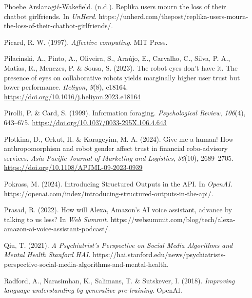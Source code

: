 \documentclass[
  letterpaper,
  DIV=11,
  numbers=noendperiod]{scrartcl}
\newlength{\cslhangindent}
\newenvironment{CSLReferences}[2] %
 {\begin{list}{}{%
  \setlength{\itemindent}{0pt}
  \setlength{\leftmargin}{0pt}
  \setlength{\parsep}{0pt}
  \ifodd #1
   \setlength{\leftmargin}{\cslhangindent}
   \setlength{\itemindent}{-1\cslhangindent}
  \fi
  \setlength{\itemsep}{#2\baselineskip}}}
 {\end{list}}
\begin{document}
\begin{CSLReferences}{1}{0}
Phoebe Arslanagić-Wakefield. (n.d.). Replika users mourn the loss of
their chatbot girlfriends. In \emph{UnHerd}.
https://unherd.com/thepost/replika-users-mourn-the-loss-of-their-chatbot-girlfriends/.

Picard, R. W. (1997). \emph{Affective computing}. MIT Press.

Pilacinski, A., Pinto, A., Oliveira, S., Araújo, E., Carvalho, C.,
Silva, P. A., Matias, R., Menezes, P. \& Sousa, S. (2023). The robot
eyes don't have it. {The} presence of eyes on collaborative robots
yields marginally higher user trust but lower performance.
\emph{Heliyon}, \emph{9}(8), e18164.
\url{https://doi.org/10.1016/j.heliyon.2023.e18164}

Pirolli, P. \& Card, S. (1999). Information foraging.
\emph{Psychological Review}, \emph{106}(4), 643--675.
\url{https://doi.org/10.1037/0033-295X.106.4.643}

Plotkina, D., Orkut, H. \& Karageyim, M. A. (2024). Give me a human!
{How} anthropomorphism and robot gender affect trust in financial
robo-advisory services. \emph{Asia Pacific Journal of Marketing and
Logistics}, \emph{36}(10), 2689--2705.
\url{https://doi.org/10.1108/APJML-09-2023-0939}

Pokrass, M. (2024). Introducing {Structured Outputs} in the {API}. In
\emph{OpenAI}.
https://openai.com/index/introducing-structured-outputs-in-the-api/.

Prasad, R. (2022). How will {Alexa}, {Amazon}'s {AI} voice assistant,
advance by talking to us less? In \emph{Web Summit}.
https://websummit.com/blog/tech/alexa-amazon-ai-voice-assistant-podcast/.

Qiu, T. (2021). \emph{A {Psychiatrist}'s {Perspective} on {Social Media
Algorithms} and {Mental Health} {\textbar} {Stanford HAI}}.
https://hai.stanford.edu/news/psychiatrists-perspective-social-media-algorithms-and-mental-health.

Radford, A., Narasimhan, K., Salimans, T. \& Sutskever, I. (2018).
\emph{Improving language understanding by generative pre-training}.
OpenAI.


\end{CSLReferences}
\end{document}
